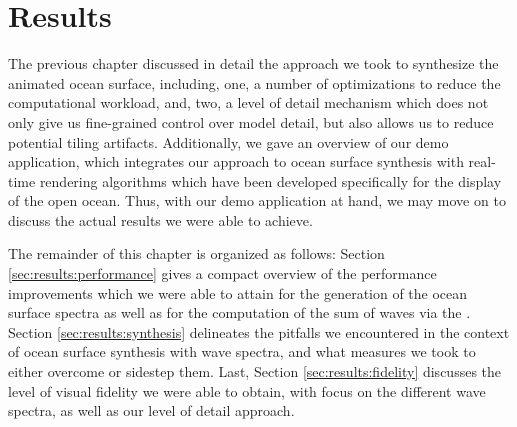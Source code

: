 \chapter{Results}
\label{ch:results}
%

The previous chapter discussed in detail the approach we took to synthesize
the animated ocean surface, including, one, a number of optimizations to reduce
the computational workload, and, two, a level of detail mechanism which does
not only give us fine-grained control over model detail, but also allows us to
reduce potential tiling artifacts. Additionally, we gave an overview of our demo
application, which integrates our approach to ocean surface synthesis
with real-time rendering algorithms which have been developed specifically for
the display of the open ocean.
Thus, with our demo application at hand, we may move on to discuss the
actual results we were able to achieve.

The remainder of this chapter is organized as follows:
Section \ref{sec:results:performance} gives a compact overview of the performance
improvements which we were able to attain for the generation of the ocean
surface spectra as well as for the computation of the sum of waves via the
\InvFourierTransform.
Section \ref{sec:results:synthesis} delineates the pitfalls we encountered
in the context of ocean surface synthesis with wave spectra, and what measures
we took to either overcome or sidestep them.
Last, Section \ref{sec:results:fidelity} discusses the level of visual fidelity
we were able to obtain, with focus on the different wave spectra, as well as
our level of detail approach.


